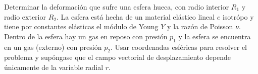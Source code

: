 \documentclass[../main.tex]{subfiles}
\begin{document}
\begin{problema}[4]
	Determinar la deformación que sufre una esfera hueca, con radio interior \(R_{1}\)
	y radio exterior \(R_{2}\). La esfera está hecha de un material elástico lineal
	\(e\) isotrópo y tiene por constantes elásticas el módulo de Young \(Y\) y la
	razón de Poisson \(\nu\). Dentro de la esfera hay un gas en reposo con presión
	\(p_{1}\) y la esfera se encuentra en un gas (externo) con presión \(p_{2}\).
	Usar coordenadas esféricas para resolver el problema y supóngase que el
	campo vectorial de desplazamiento depende únicamente de la variable radial
	\(r\).
\end{problema}
\end{document}
